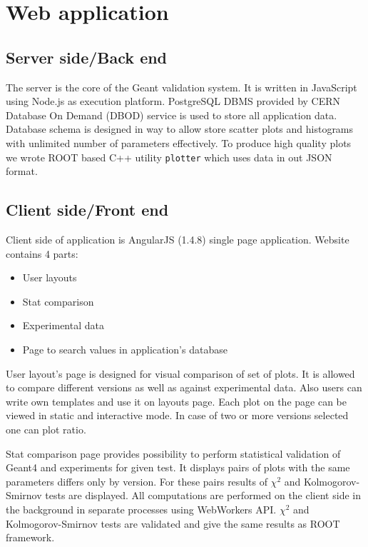 \section{Web application}
\label{sec-webapplication}

\subsection{Server side/Back end}
\label{sec-webapplication-server}

The server is the core of the Geant validation system.
It is written in JavaScript using Node.js as execution platform. PostgreSQL DBMS provided by CERN Database On Demand (DBOD) service is used to store all application data. Database schema is designed in way to allow store scatter plots and histograms with unlimited number of parameters effectively. To produce high quality plots we wrote ROOT based C++ utility {\tt plotter} which uses data in out JSON format.

\subsection{Client side/Front end}
\label{sec-webapplication-client}

Client side of application is AngularJS (1.4.8) single page application. Website contains 4 parts:

\begin{itemize}
    \item User layouts
    \item Stat comparison
    \item Experimental data
    \item Page to search values in application's database
\end{itemize}

User layout's page is designed for visual comparison of set of plots. It is allowed to compare different versions as well as against experimental data. Also users can write own templates and use it on layouts page. Each plot on the page can be viewed in static and interactive mode. In case of two or more versions selected one can plot ratio.

Stat comparison page provides possibility to perform statistical validation of Geant4 and experiments for given test. It displays pairs of plots with the same parameters differs only by version. For these pairs results of $\chi^2$ and Kolmogorov-Smirnov tests are displayed. All computations are performed on the client side in the background in separate processes using WebWorkers API. $\chi^2$ and Kolmogorov-Smirnov tests are validated and give the same results as ROOT framework.

